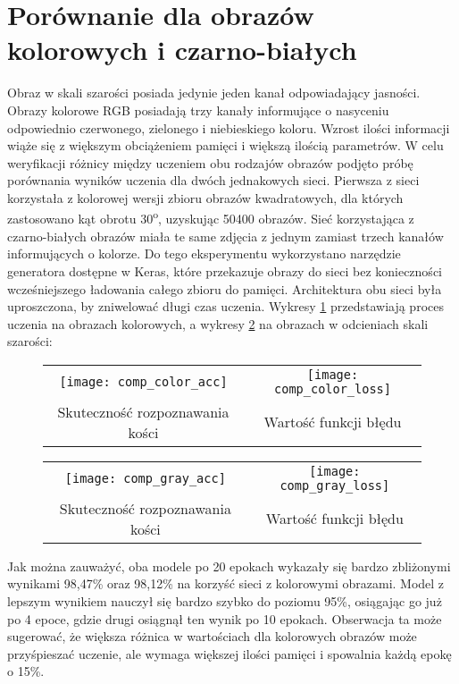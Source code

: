 \section{Porównanie dla obrazów kolorowych i czarno-białych}
Obraz w skali szarości posiada jedynie jeden kanał odpowiadający jasności. Obrazy kolorowe RGB
posiadają trzy kanały informujące o nasyceniu odpowiednio czerwonego, zielonego i niebieskiego koloru.
Wzrost ilości informacji wiąże się z większym obciążeniem pamięci i większą ilością parametrów.
W celu weryfikacji różnicy między uczeniem obu rodzajów obrazów podjęto próbę porównania wyników
uczenia dla dwóch jednakowych sieci. Pierwsza z sieci korzystała z kolorowej wersji zbioru
obrazów kwadratowych, dla których zastosowano kąt obrotu 30\textsuperscript{o}, uzyskując
50400 obrazów. Sieć korzystająca z czarno-białych obrazów miała te same zdjęcia z jednym
zamiast trzech kanałów informujących o kolorze. Do tego eksperymentu
wykorzystano narzędzie generatora dostępne w Keras, które przekazuje obrazy do sieci
bez konieczności wcześniejszego ładowania całego zbioru do pamięci. Architektura obu
sieci była uproszczona, by zniwelować długi czas uczenia. Wykresy \ref{fig:comp_color} przedstawiają
proces uczenia na obrazach kolorowych, a wykresy \ref{fig:comp_gray} na obrazach w odcieniach skali szarości:\\
\begin{figure}[h!]
\begin{center}
\begin{tabular}{cc}
\texttt{[image: comp\_color\_acc]} &
\texttt{[image: comp\_color\_loss]} \\
 Skuteczność rozpoznawania kości & Wartość funkcji błędu\\
\end{tabular}
\label{fig:comp_color}
\end{center}
\end{figure}
\begin{figure}[h!]
\begin{center}
\begin{tabular}{cc}
\texttt{[image: comp\_gray\_acc]} &
\texttt{[image: comp\_gray\_loss]} \\
 Skuteczność rozpoznawania kości & Wartość funkcji błędu\\
\end{tabular}
\label{fig:comp_gray}
\end{center}
\end{figure}\newpage
Jak można zauważyć, oba modele po 20 epokach wykazały się bardzo zbliżonymi wynikami 98,47\% oraz 98,12\%
na korzyść sieci z kolorowymi obrazami. Model z lepszym wynikiem nauczył się bardzo szybko
do poziomu 95\%, osiągając go już po 4 epoce, gdzie drugi osiągnął ten wynik po 10 epokach.
Obserwacja ta może sugerować, że większa różnica w wartościach dla kolorowych obrazów
może przyśpieszać uczenie, ale wymaga większej ilości pamięci i spowalnia każdą epokę o 15\%.

